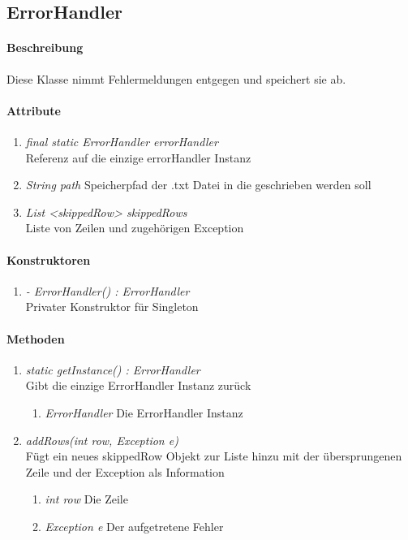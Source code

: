 \subsection{ErrorHandler}

\paragraph{Beschreibung}
Diese Klasse nimmt Fehlermeldungen entgegen und speichert sie ab.

\paragraph{Attribute}

\begin{enumerate}[$\bullet$]
	\item \textit{final static ErrorHandler errorHandler} \\Referenz auf die einzige errorHandler Instanz
	\item \textit{String path} Speicherpfad der .txt Datei in die geschrieben werden soll
	\item \textit{List <skippedRow> skippedRows} \\ Liste von Zeilen und zugehörigen Exception
\end{enumerate}

\paragraph{Konstruktoren}
\begin{enumerate}[+]
	\item \textit{ - ErrorHandler() : ErrorHandler}  \\Privater Konstruktor für Singleton
\end{enumerate}

\paragraph{Methoden}

\begin{enumerate}[+]
	\item \textit{static getInstance() : ErrorHandler} \\ Gibt die einzige ErrorHandler Instanz zurück
\begin{enumerate}[$\circ$]
	\item \textit{ErrorHandler} Die ErrorHandler Instanz
\end{enumerate}
\item \textit{addRows(int row, Exception e)	}
\\Fügt ein neues skippedRow Objekt zur Liste hinzu mit der übersprungenen Zeile und der Exception als Information 
\begin{enumerate}[$\bullet$]
	\item \textit{int row} Die Zeile
	\item \textit{Exception e} Der aufgetretene Fehler
\end{enumerate}
\end{enumerate}

